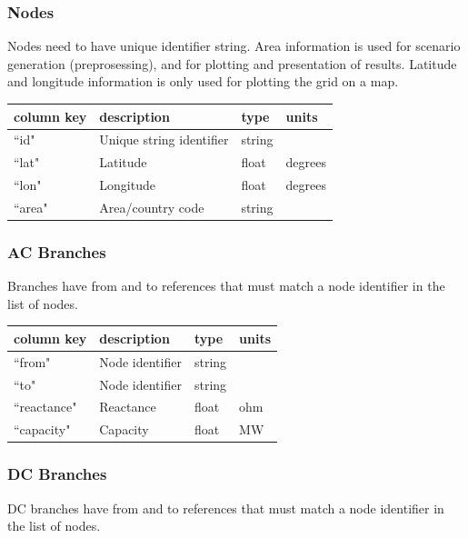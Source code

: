 \documentclass{article}
\begin{document}
\subsubsection{Nodes}
Nodes need to have unique identifier string. Area information is used for scenario generation (preprosessing), and for plotting and presentation of results.
Latitude and longitude information is only used for plotting the grid on a map.

\medskip
\begin{tabular}{llll}
	\hline
	column key & description & type & units \\
	\hline
	``id"	&	Unique string identifier 	& string	& \\
	``lat"	&	Latitude				& float 	& degrees \\
	``lon"	&	Longitude				& float	& degrees \\
	``area" &	Area/country code		& string	& \\
	\hline
\end{tabular}


\subsubsection{AC Branches}
Branches have from and to references that must match a node identifier in the list of nodes.

\medskip
\begin{tabular}{llll}
	\hline
	column key & description & type & units \\
	\hline
	``from"	&	Node identifier 	& string	& \\
	``to"		&	Node identifier	& string	& \\
	``reactance"	&	Reactance	& float	& ohm \\
	``capacity"		&	Capacity & float		& MW \\
	\hline
\end{tabular}

\subsubsection{DC Branches}
DC branches have from and to references that must match a node identifier in the list of nodes.
\end{document}
